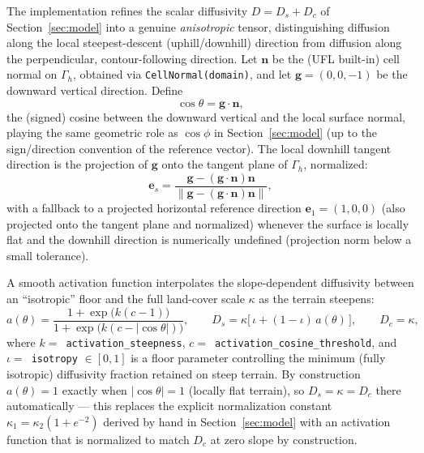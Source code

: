 \documentclass[11pt]{article}
\begin{document}
The implementation refines the scalar diffusivity $D=D_s+D_c$ of Section~\ref{sec:model} into a genuine \emph{anisotropic} tensor, distinguishing diffusion along the local steepest-descent (uphill/downhill) direction from diffusion along the perpendicular, contour-following direction. Let $\mathbf{n}$ be the (UFL built-in) cell normal on $\Gamma_h$, obtained via \texttt{CellNormal(domain)}, and let $\mathbf{g}=(0,0,-1)$ be the downward vertical direction. Define
\[
\cos\theta = \mathbf{g}\cdot\mathbf{n},
\]
the (signed) cosine between the downward vertical and the local surface normal, playing the same geometric role as $\cos\phi$ in Section~\ref{sec:model} (up to the sign/direction convention of the reference vector). The local downhill tangent direction is the projection of $\mathbf{g}$ onto the tangent plane of $\Gamma_h$, normalized:
\[
\mathbf{e}_s = \frac{\mathbf{g}-(\mathbf{g}\cdot\mathbf{n})\mathbf{n}}{\big\lVert \mathbf{g}-(\mathbf{g}\cdot\mathbf{n})\mathbf{n}\big\rVert},
\]
with a fallback to a projected horizontal reference direction $\mathbf{e}_1 = (1,0,0)$ (also projected onto the tangent plane and normalized) whenever the surface is locally flat and the downhill direction is numerically undefined (projection norm below a small tolerance).

A smooth activation function interpolates the slope-dependent diffusivity between an ``isotropic'' floor and the full land-cover scale $\kappa$ as the terrain steepens:
\begin{equation}
a(\theta) = \frac{1+\exp\!\big(k(c-1)\big)}{1+\exp\!\big(k(c-|\cos\theta|)\big)}, \qquad
D_s = \kappa\big[\,\iota + (1-\iota)\,a(\theta)\,\big], \qquad D_c = \kappa,
\end{equation}
where $k=$~\texttt{activation\_steepness}, $c=$~\texttt{activation\_cosine\_threshold}, and $\iota=$~\texttt{isotropy} $\in[0,1]$ is a floor parameter controlling the minimum (fully isotropic) diffusivity fraction retained on steep terrain. By construction $a(\theta)=1$ exactly when $|\cos\theta|=1$ (locally flat terrain), so $D_s=\kappa=D_c$ there automatically --- this replaces the explicit normalization constant $\kappa_1=\kappa_2(1+e^{-2})$ derived by hand in Section~\ref{sec:model} with an activation function that is normalized to match $D_c$ at zero slope by construction.
\end{document}
